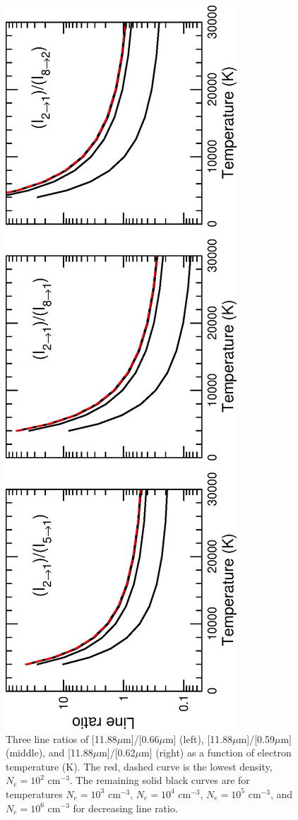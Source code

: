 %
\begin{figure}
\centering
\includegraphics[scale=0.8, angle=-90]{Figures/Cobalt/modelling/lineratio_new.eps}
\caption{Three line ratios of [11.88$\mu$m]/[0.66$\mu$m] (left), [11.88$\mu$m]/[0.59$\mu$m] (middle), and [11.88$\mu$m]/[0.62$\mu$m] (right) as a function of electron temperature (K). The red, dashed curve is the lowest density, $N_e = 10^2$ cm$^{-3}$. The remaining solid black curves are for temperatures $N_e = 10^3$ cm$^{-3}$, $N_e = 10^4$ cm$^{-3}$, $N_e = 10^5$ cm$^{-3}$, and $N_e = 10^6$ cm$^{-3}$ for decreasing line ratio.\label{fig:co_constdens}}
\end{figure}
%


